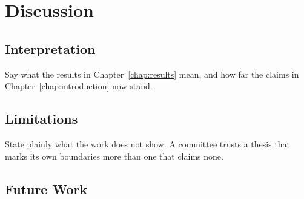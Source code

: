 
\chapter{Discussion}\label{chap:discussion}

\section{Interpretation}

Say what the results in Chapter~\ref{chap:results} mean, and how far the claims
in Chapter~\ref{chap:introduction} now stand.

\lipsum[7][1-5]

\section{Limitations}

State plainly what the work does not show. A committee trusts a thesis that
marks its own boundaries more than one that claims none.

\lipsum[8][1-4]

\section{Future Work}

\lipsum[9][1-4]
